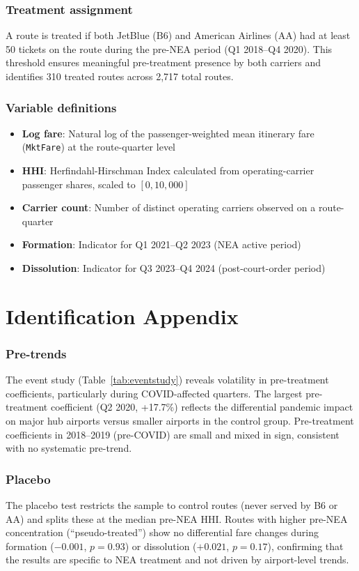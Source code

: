 \documentclass[12pt]{article}
\begin{document}
\subsubsection*{Treatment assignment} A route is treated if both JetBlue (B6) and American Airlines (AA) had at least 50 tickets on the route during the pre-NEA period (Q1 2018--Q4 2020). This threshold ensures meaningful pre-treatment presence by both carriers and identifies 310 treated routes across 2,717 total routes.

\subsubsection*{Variable definitions}
\begin{itemize}
\item \textbf{Log fare}: Natural log of the passenger-weighted mean itinerary fare (\texttt{MktFare}) at the route-quarter level
\item \textbf{HHI}: Herfindahl-Hirschman Index calculated from operating-carrier passenger shares, scaled to $[0, 10{,}000]$
\item \textbf{Carrier count}: Number of distinct operating carriers observed on a route-quarter
\item \textbf{Formation}: Indicator for Q1 2021--Q2 2023 (NEA active period)
\item \textbf{Dissolution}: Indicator for Q3 2023--Q4 2024 (post-court-order period)
\end{itemize}


\section{Identification Appendix}

\subsubsection*{Pre-trends} The event study (Table~\ref{tab:eventstudy}) reveals volatility in pre-treatment coefficients, particularly during COVID-affected quarters. The largest pre-treatment coefficient (Q2 2020, +17.7\%) reflects the differential pandemic impact on major hub airports versus smaller airports in the control group. Pre-treatment coefficients in 2018--2019 (pre-COVID) are small and mixed in sign, consistent with no systematic pre-trend.

\subsubsection*{Placebo} The placebo test restricts the sample to control routes (never served by B6 or AA) and splits these at the median pre-NEA HHI. Routes with higher pre-NEA concentration (``pseudo-treated'') show no differential fare changes during formation ($-0.001$, $p = 0.93$) or dissolution ($+0.021$, $p = 0.17$), confirming that the results are specific to NEA treatment and not driven by airport-level trends.
\end{document}
